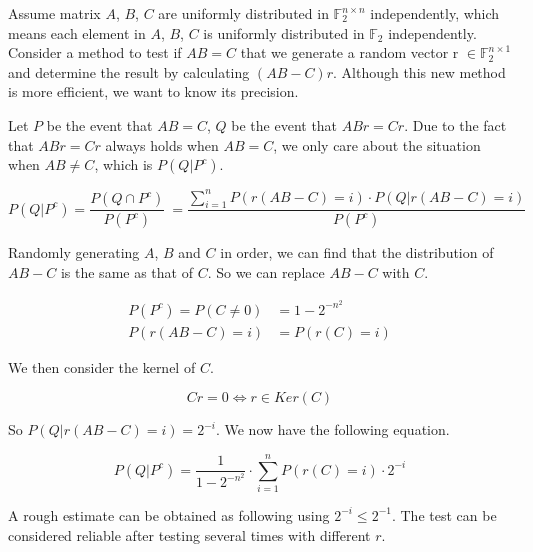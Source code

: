 	\begin{prob} 
	Assume matrix $A$, $B$, $C$ are uniformly distributed in $\mathbb{F}_2^{n \times n}$ independently, which means each element in $A$, $B$, $C$ is uniformly distributed in $\mathbb{F}_2$ independently. Consider a method to test if $AB = C$ that we generate a random vector r $\in \mathbb{F}_2^{n \times 1}$ and determine the result by calculating $(AB - C)r$. Although this new method is more efficient, we want to know its precision.
	
	\sol
	Let $P$ be the event that $AB = C$, $Q$ be the event that $ABr = Cr$. Due to the fact that $ABr = Cr$ always holds when $AB = C$, we only care about the situation when $AB \neq C$, which is $P(Q|P^c)$.
	
	\begin{equation*}
		P(Q|P^c) = \dfrac{P(Q \cap P^c)}{P(P^c)} \
				= \dfrac{\sum\limits_{i = 1}^{n}P(r(AB - C) = i) \cdot P(Q | r(AB - C) = i)}{P(P^c)}
	\end{equation*}
	
	Randomly generating $A$, $B$ and $C$ in order, we can find that the distribution of $AB - C$ is the same as that of $C$. So we can replace $AB - C$ with $C$.
	
		\begin{equation*}
		\begin{split}
			P(P^c) = P(C \neq 0) &= 1 - 2^{-n^2} \\
			P(r(AB - C) = i) &= P(r(C) = i)
		\end{split}
		\end{equation*}
	
	We then consider the kernel of $C$.
	
	\begin{equation*}
		Cr = 0 \iff r \in Ker(C)
	\end{equation*}

	So $P(Q | r(AB - C) = i) = 2 ^ {-i}$. We now have the following equation.
	
	\begin{equation*}
		P(Q|P^c) = \dfrac{1}{1 - 2^{-n^2}} \cdot \sum\limits_{i = 1}^{n}P(r(C) = i) \cdot 2^{-i}
	\end{equation*}
	
	A rough estimate can be obtained as following using $2^{-i} \le 2^{-1}$. The test can be considered reliable after testing several times with different $r$.
		

\end{prob}
